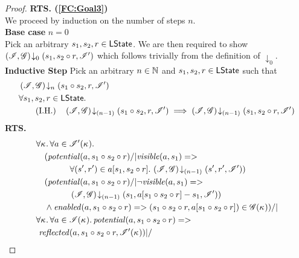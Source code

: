 \begin{lemma}
\begin{proof}
\noindent\textbf{RTS. (\ref{FC:Goal3})} \\
We proceed by induction on the number of steps $n$.\\

\noindent\textbf{Base case }$n=0$\\
Pick an arbitrary $s_1, s_2, r \in \textsf{LState}$. We are then required to show	$\left(\mathscr{I}, \mathscr{G}\right) \!\downarrow_{0} \left(s_1, s_2 \circ r, \mathscr{I}'\right) $ which follows trivially from the definition of $\downarrow_0$.\\

\noindent\textbf{Inductive Step} Pick an arbitrary $n \in \mathbb{N}$ and $s_1, s_2, r \in \textsf{LState}$ such that
%
\begin{align}
	& \extendsAMUpto{\lmod, \gmod}{n}{s_1 \composeL s_2}{r}{\lmod'} \label{LCS:Ass1}\\
%
	&	\for{s_1, s_2, r \in \LStates} \nonumber \\	
	& \tag{I.H.} \quad\extendsAMUpto{\lmod, \gmod}{(n-1)}{s_1 \composeL s_2}{r}{\lmod'} \implies 
										\extendsAMUpto{\lmod, \gmod}{(n-1)}{s_1}{s_2 \composeL r}{\lmod'} \label{LCS:IH}
\end{align}
%
\textbf{RTS. }
%
\begin{align}
	& 
	\V{\ca{}}  \V{a\in \lmod'(\ca{})} \nonumber \\
  &\quad (\m{potential}(a, s_1 \composeL s_2\composeL r) /| \m{visible}(a, s_1)=> \nonumber\\
  & \qquad \qquad\for{(s', r') \in a[s_1, s_2 \composeL r]} \extendsAMUpto{\lmod, \gmod}{(n-1)}{s'}{r'}{\lmod'}) \label{LCS:Goal0}\\
%  
  &\quad (\m{potential}(a, s_1 \composeL s_2\composeL r) /| \neg\m{visible}(a, s_1)=> \nonumber\\
  & \qquad \qquad \extendsAMUpto{\lmod, \gmod}{(n-1)}{s_1}{a[s_1 \composeL s_2 \composeL r] - s_1}{\lmod'}) \label{LCS:Goal1}\\
%    
  &\quad\land \m{enabled}(a,s_1 \composeL s_2 \composeL r)
  => (s_1 \composeL s_2 \composeL r,
  a[s_1 \composeL s_2 \composeL r])\in \gmod(\ca{}))
  /|\null \label{LCS:Goal2}\\
%  
  &\V{\ca{}}\V{a\in \lmod(\ca{})}
  \m{potential}(a,s_1 \composeL s_2 \composeL r) =>\null \nonumber \\
  &\ \m{reflected}(a,s_1 \composeL s_2 \composeL r,\lmod'(\ca{})) |/\null \nonumber \\

\end{align}
\end{proof}
\end{lemma}
